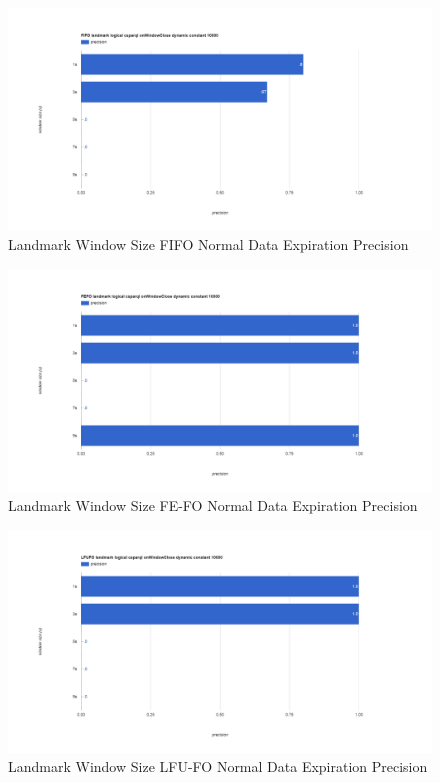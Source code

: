 \begin{figure}[!htbp]
	\centering
    \includegraphics[width=\textwidth]{img/app3-land-ws-fifo-normal-p.png}
    \caption{Landmark Window Size FIFO Normal Data Expiration Precision}
\end{figure}
\begin{figure}[!htbp]
	\centering
    \includegraphics[width=\textwidth]{img/app3-land-ws-fefo-normal-p.png}
    \caption{Landmark Window Size FE-FO Normal Data Expiration Precision}
\end{figure}
\begin{figure}[!htbp]
	\centering
    \includegraphics[width=\textwidth]{img/app3-land-ws-lfufo-normal-p.png}
    \caption{Landmark Window Size LFU-FO Normal Data Expiration Precision}
\end{figure}
